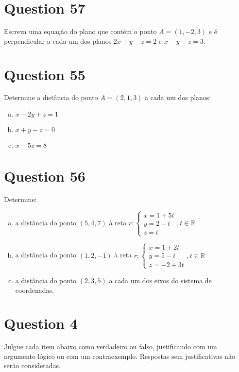 \documentclass{article}
\begin{document}
\section*{Question 57}
Escreva uma equação do plano que contém o ponto $A = (1, -2, 3)$ e é perpendicular a cada um dos planos $2x + y - z = 2$ e $x - y - z = 3$.

\section*{Question 55}
Determine a distância do ponto $A = (2, 1, 3)$ a cada um dos planos:
\begin{enumerate}[a)]
\item $x - 2y + z = 1$
\item $x + y - z = 0$
\item $x - 5z = 8$
\end{enumerate}

\section*{Question 56}
Determine:
\begin{enumerate}[a)]
\item a distância do ponto $(5, 4, 7)$ à reta $r: \begin{cases} x = 1 + 5t \\ y = 2 - t \\ z = t \end{cases}, t \in \mathbb{R}$
\item a distância do ponto $(1, 2, -1)$ à reta $r: \begin{cases} x = 1 + 2t \\ y = 5 - t \\ z = -2 + 3t \end{cases}, t \in \mathbb{R}$
\item a distância do ponto $(2, 3, 5)$ a cada um dos eixos do sistema de coordenadas.
\end{enumerate}

\section*{Question 4}
Julgue cada item abaixo como verdadeiro ou falso, justificando com um argumento lógico ou com um contraexemplo. Respostas sem justificativas não serão consideradas.
\end{document}
